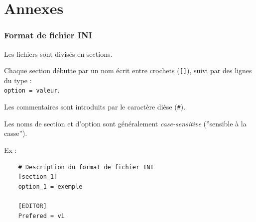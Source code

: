 \part{Annexes}
\section{Format de fichier INI}
\label{sec:anx_ini}

  Les fichiers sont divisés en sections.

  Chaque section débutte par un nom écrit entre crochets (\texttt{[]}),
  suivi par des lignes du type : \\
  \texttt{option~=~valeur}.

  Les commentaires sont introduits par le caractère dièse (\texttt{\#}).

  Les noms de section et d'option sont généralement \textit{case-sensitive}
  (''sensible à la casse'').

  Ex :
  \begin{lstlisting}
    # Description du format de fichier INI
    [section_1]
    option_1 = exemple

    [EDITOR]
    Prefered = vi
  \end{lstlisting}
